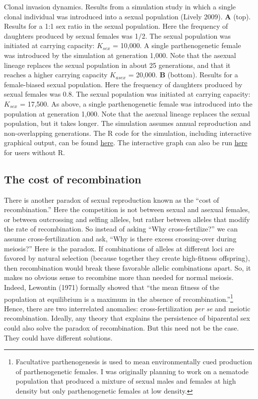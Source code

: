 \documentclass[
  letterpaper,
]{book}
\begin{document}
{\label{fig-1-2}Clonal invasion dynamics. Results from a simulation study
in which a single clonal individual was introduced into a sexual
population (Lively 2009). \textbf{A} (top). Results for a 1:1 sex ratio
in the sexual population. Here the frequency of daughters produced by
sexual females was 1/2. The sexual population was initiated at carrying
capacity: \(K_{sex}\) = 10,000. A single parthenogenetic female was
introduced by the simulation at generation 1,000. Note that the asexual
lineage replaces the sexual population in about 25 generations, and that
it reaches a higher carrying capacity \(K_{asex}\) = 20,000. \textbf{B}
(bottom). Results for a female-biased sexual population. Here the
frequency of daughters produced by sexual females was 0.8. The sexual
population was initiated at carrying capacity: \(K_{sex}\) = 17,500. As
above, a single parthenogenetic female was introduced into the
population at generation 1,000. Note that the asexual lineage replaces
the sexual population, but it takes longer. The simulation assumes
annual reproduction and non-overlapping generations. The R code for the
simulation, including interactive graphical output, can be found
\href{https://raw.githubusercontent.com/IULibScholComm/through-the-looking-glass/main/sim\%20for\%20fig\%201.2(ZMD).R}{here}.
The interactive graph can also be run
\href{https://connect.posit.iu.edu/clonal-invasion-dynamics/}{here} for
users without R.

}

\hypertarget{the-cost-of-recombination}{%
\subsection{The cost of recombination}\label{the-cost-of-recombination}}

There is another paradox of sexual reproduction known as the ``cost of
recombination.'' Here the competition is not between sexual and asexual
females, or between outcrossing and selfing alleles, but rather between
alleles that modify the rate of recombination. So instead of asking
``Why cross-fertilize?'' we can assume cross-fertilization and ask,
``Why is there excess crossing-over during meiosis?'' Here is the
paradox. If combinations of alleles at different loci are favored by
natural selection (because together they create high-fitness offspring),
then recombination would break these favorable allelic combinations
apart. So, it makes no obvious sense to recombine more than needed for
normal meiosis. Indeed, Lewontin (1971) formally showed that ``the mean
fitness of the population at equilibrium is a maximum in the absence of
recombination.''\footnote{Facultative parthenogenesis is used to mean
  environmentally cued production of parthenogenetic females. I was
  originally planning to work on a nematode population that produced a
  mixture of sexual males and females at high density but only
  parthenogenetic females at low density.} Hence, there are two
interrelated anomalies: cross-fertilization \emph{per se} and meiotic
recombination. Ideally, any theory that explains the persistence of
biparental sex could also solve the paradox of recombination. But this
need not be the case. They could have different solutions.
\end{document}
